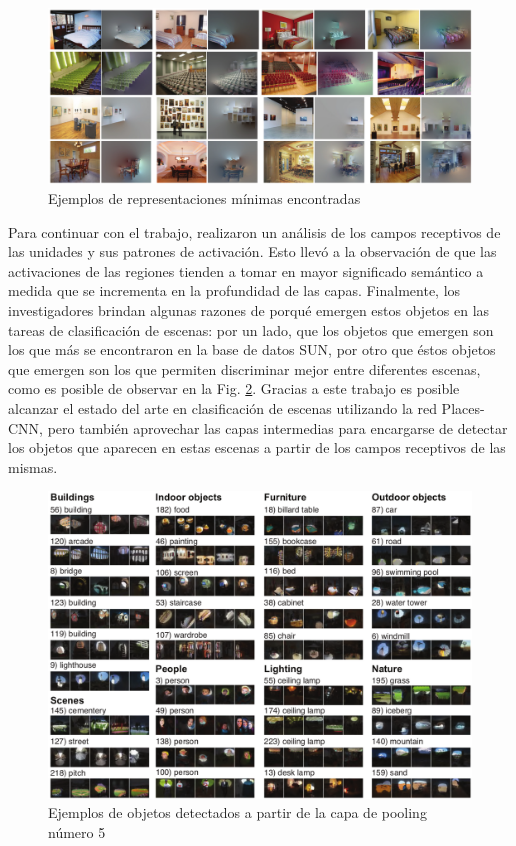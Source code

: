 \begin{figure}[h!]
	\centering
	\includegraphics[width=1\linewidth]{images/objects_detectors_emerge_min_representation_examples}
	\caption[Ejemplos de representaciones mínimas encontradas]{Ejemplos de representaciones mínimas encontradas}
	\label{fig:objectsdetectorsemergeminrepresentationexamples}
\end{figure}

Para continuar con el trabajo, realizaron un análisis de los campos receptivos de las unidades y sus patrones de activación. Esto llevó a la observación de que las activaciones de las regiones tienden a tomar en mayor significado semántico a medida que se incrementa en la profundidad de las capas.
Finalmente, los investigadores brindan algunas razones de porqué emergen estos objetos en las tareas de clasificación de escenas: por un lado, que los objetos que emergen son los que más se encontraron en la base de datos SUN, por otro que éstos objetos que emergen son los que permiten discriminar mejor entre diferentes escenas, como es posible de observar en la Fig. 	\ref{fig:objectsdetectorsemergefinalexample}. Gracias a este trabajo es posible alcanzar el estado del arte en clasificación de escenas utilizando la red Places-CNN, pero también aprovechar las capas intermedias para encargarse de detectar los objetos que aparecen en estas escenas a partir de los campos receptivos de las mismas.
\begin{figure}[h!]
	\centering
	\includegraphics[width=1\linewidth, height=0.7\textheight]{images/objects_detectors_emerge_final_example}
	\caption[Ejemplos de objetos detectados a partir de la capa de pooling número 5]{Ejemplos de objetos detectados a partir de la capa de pooling número 5}
	\label{fig:objectsdetectorsemergefinalexample}
\end{figure}


